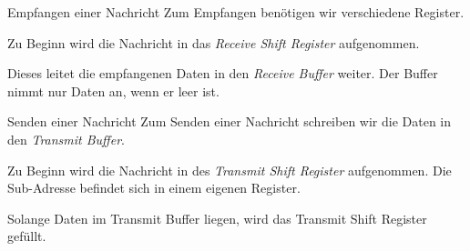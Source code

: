 \begin{bonus}{Empfangen einer Nachricht}
    Zum Empfangen benötigen wir verschiedene Register.

    Zu Beginn wird die Nachricht in das \emph{Receive Shift Register} aufgenommen.

    Dieses leitet die empfangenen Daten in den \emph{Receive Buffer} weiter.
    Der Buffer nimmt nur Daten an, wenn er leer ist.
\end{bonus}

\begin{bonus}{Senden einer Nachricht}
    Zum Senden einer Nachricht schreiben wir die Daten in  den \emph{Transmit Buffer}.

    Zu Beginn wird die Nachricht in des \emph{Transmit Shift Register} aufgenommen.
    Die Sub-Adresse befindet sich in einem eigenen Register.

    Solange Daten im Transmit Buffer liegen, wird das Transmit Shift Register gefüllt.
\end{bonus}
